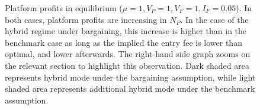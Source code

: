 \documentclass[a4paper]{article}
\begin{document}
\begin{figure}
\begin{subfigure}[b]{0.45\textwidth}
        \caption{}
    \end{subfigure}
    \caption{Platform profits in equilibrium ($\mu = 1, V_P = 1, V_F = 1, I_F = 0.05$). In both cases, platform profits are increasing in $N_P$. In the case of the hybrid regime under bargaining, this increase is higher than in the benchmark case as long as the implied the entry fee is lower than optimal, and lower afterwards. The right-hand side graph zooms on the relevant section to highlight this observation. Dark shaded area represents hybrid mode under the bargaining assumption, while light shaded area represents additional hybrid mode under the benchmark assumption.}
    \label{fig:platform_profits}
\end{figure}
\end{document}
